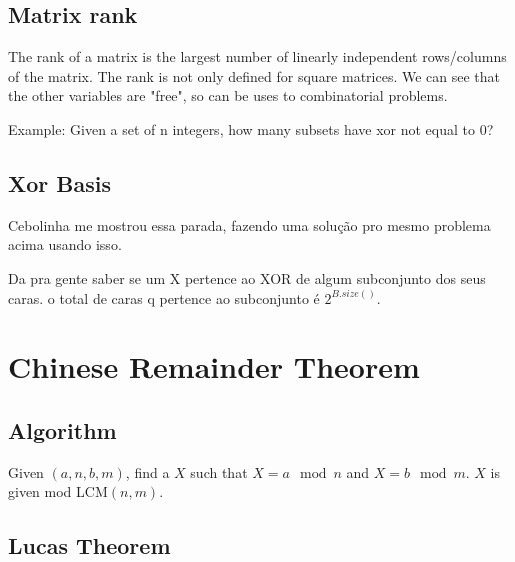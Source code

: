         \subsection{Matrix rank}
        \tab The rank of a matrix is the largest number of linearly independent rows/columns of the matrix. The rank is not only defined for square matrices.
        We can see that the other variables are "free", so can be uses to combinatorial problems.
        
        Example: Given a set of n integers, how many subsets have xor not equal to 0?
        

        \subsection{Xor Basis}
        \tab Cebolinha me mostrou essa parada, fazendo uma solução pro mesmo problema acima usando isso.

        Da pra gente saber se um X pertence ao XOR de algum subconjunto dos seus caras.
        o total de caras q pertence ao subconjunto é $2^{B.size()}$.

        
    \section{Chinese Remainder Theorem}


        \subsection{Algorithm}

        \tab Given $(a, n, b, m)$, find a $X$ such that $X = a \mod n$ and $X = b \mod m$. $X$ is given mod LCM$(n, m)$.
        

        \subsection{Lucas Theorem}

